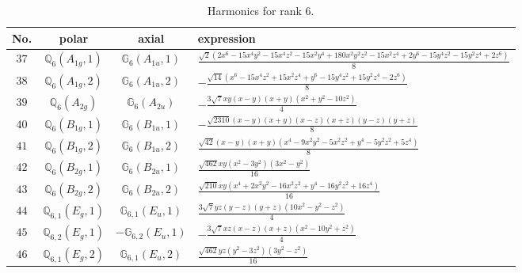 \documentclass[fleqn,8pt,landscape]{jsarticle}
\begin{document}
\begin{table}[ht!]
\begin{center}
\caption{Harmonics for rank 6.}
\renewcommand{\arraystretch}{1.3}
\begin{tabular}{cccl} \hline \hline
No. & polar & axial & expression \\ \hline
$ 37 $ & $ \mathbb{Q}_{6}(A_{1g},1) $ & $ \mathbb{G}_{6}(A_{1u},1) $ & $ \frac{\sqrt{2} \left(2 x^{6} - 15 x^{4} y^{2} - 15 x^{4} z^{2} - 15 x^{2} y^{4} + 180 x^{2} y^{2} z^{2} - 15 x^{2} z^{4} + 2 y^{6} - 15 y^{4} z^{2} - 15 y^{2} z^{4} + 2 z^{6}\right)}{8} $ \\
$ 38 $ & $ \mathbb{Q}_{6}(A_{1g},2) $ & $ \mathbb{G}_{6}(A_{1u},2) $ & $ - \frac{\sqrt{14} \left(x^{6} - 15 x^{4} z^{2} + 15 x^{2} z^{4} + y^{6} - 15 y^{4} z^{2} + 15 y^{2} z^{4} - 2 z^{6}\right)}{8} $ \\
$ 39 $ & $ \mathbb{Q}_{6}(A_{2g}) $ & $ \mathbb{G}_{6}(A_{2u}) $ & $ - \frac{3 \sqrt{7} x y \left(x - y\right) \left(x + y\right) \left(x^{2} + y^{2} - 10 z^{2}\right)}{4} $ \\
$ 40 $ & $ \mathbb{Q}_{6}(B_{1g},1) $ & $ \mathbb{G}_{6}(B_{1u},1) $ & $ - \frac{\sqrt{2310} \left(x - y\right) \left(x + y\right) \left(x - z\right) \left(x + z\right) \left(y - z\right) \left(y + z\right)}{8} $ \\
$ 41 $ & $ \mathbb{Q}_{6}(B_{1g},2) $ & $ \mathbb{G}_{6}(B_{1u},2) $ & $ \frac{\sqrt{42} \left(x - y\right) \left(x + y\right) \left(x^{4} - 9 x^{2} y^{2} - 5 x^{2} z^{2} + y^{4} - 5 y^{2} z^{2} + 5 z^{4}\right)}{8} $ \\
$ 42 $ & $ \mathbb{Q}_{6}(B_{2g},1) $ & $ \mathbb{G}_{6}(B_{2u},1) $ & $ \frac{\sqrt{462} x y \left(x^{2} - 3 y^{2}\right) \left(3 x^{2} - y^{2}\right)}{16} $ \\
$ 43 $ & $ \mathbb{Q}_{6}(B_{2g},2) $ & $ \mathbb{G}_{6}(B_{2u},2) $ & $ \frac{\sqrt{210} x y \left(x^{4} + 2 x^{2} y^{2} - 16 x^{2} z^{2} + y^{4} - 16 y^{2} z^{2} + 16 z^{4}\right)}{16} $ \\
$ 44 $ & $ \mathbb{Q}_{6,1}(E_{g},1) $ & $ \mathbb{G}_{6,1}(E_{u},1) $ & $ \frac{3 \sqrt{7} y z \left(y - z\right) \left(y + z\right) \left(10 x^{2} - y^{2} - z^{2}\right)}{4} $ \\
$ 45 $ & $ \mathbb{Q}_{6,2}(E_{g},1) $ & $ -\mathbb{G}_{6,2}(E_{u},1) $ & $ - \frac{3 \sqrt{7} x z \left(x - z\right) \left(x + z\right) \left(x^{2} - 10 y^{2} + z^{2}\right)}{4} $ \\
$ 46 $ & $ \mathbb{Q}_{6,1}(E_{g},2) $ & $ \mathbb{G}_{6,1}(E_{u},2) $ & $ \frac{\sqrt{462} y z \left(y^{2} - 3 z^{2}\right) \left(3 y^{2} - z^{2}\right)}{16} $ \\

\end{tabular}
\end{center}
\end{table}
\end{document}
